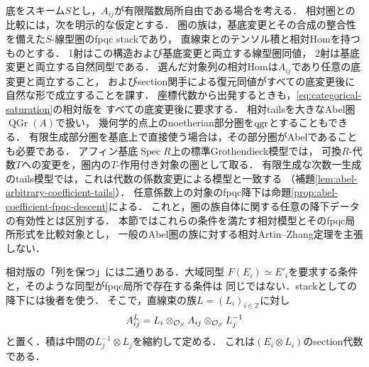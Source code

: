 底をスキーム$S$とし，$A_{ij}$が有限階数局所自由である場合を考える．
相対圏との比較には，次を明示的な仮定とする．
圏の族は，基底変更とその合成の整合性を備えた$S$-線型圏のfpqc stackであり，
直線束とのテンソル積と相対Homを持つものとする．
1射はこの構造および基底変更と両立する線型圏同値，
2射は基底変更と両立する自然同型である．
選んだ対象列の相対Homは$A_{ij}$であり任意の底変更と両立すること，
およびsection関手による復元同値がすべての底変更後に自然な形で成立することを課す．
座標代数から出発するときも，\eqref{eq:categorical-saturation}の相対版を
すべての底変更後に要求する．
相対tailsを大きなAbel圏$\operatorname{QGr}(A)$で扱い，
幾何学的点上のnoetherian部分圏を$\operatorname{qgr}$とすることもできる．
有限生成部分圏を基底上で直接使う場合は，その部分圏がAbelであることも必要である．
アフィン基底$\operatorname{Spec}R$上の標準Grothendieck模型では，
可換$R$-代数$T$への変更を，圏内の$T$-作用付き対象の圏として取る．
有限生成な次数一生成のtails模型では，これは代数の係数変更による模型と一致する
（補題\ref{lem:abel-arbitrary-coefficient-tails}）．
任意係数上の対象のfpqc降下は命題\ref{prop:abel-coefficient-fpqc-descent}による．
これと，圏の族自体に関する任意の降下データの有効性とは区別する．
本節ではこれらの条件を満たす相対模型とそのfpqc局所形式を比較対象とし，
一般のAbel圏の族に対する相対Artin--Zhang定理を主張しない．

相対版の「列を保つ」には二通りある．大域同型
$F(E_i)\simeq E'_i$を要求する条件と，そのような同型がfpqc局所で存在する条件は
同じではない．stackとしての降下には後者を使う．
そこで，直線束の族$L=(L_i)_{i\in\mathbb Z}$に対し
\begin{equation}\label{eq:categorical-line-twist}
 A^L_{ij}=L_i\otimes_{\mathcal O_S}A_{ij}\otimes_{\mathcal O_S}L_j^{-1}
\end{equation}
と置く．積は中間の$L_j^{-1}\otimes L_j$を縮約して定める．
これは$(E_i\otimes L_i)$のsection代数である．

